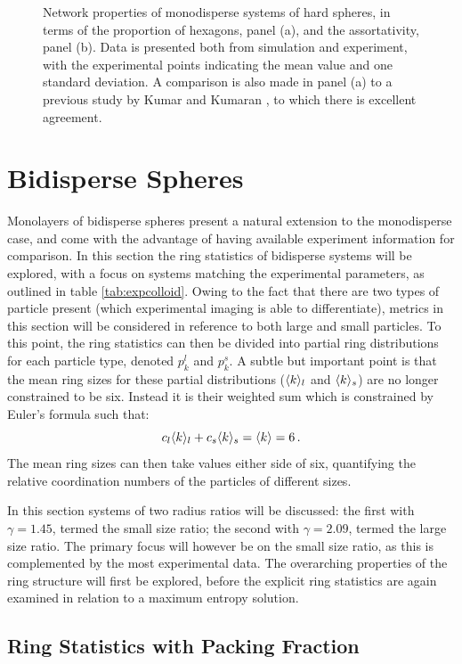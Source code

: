 \begin{figure}[bt]
     \caption{Network properties of monodisperse systems of \qtd{} hard spheres, in terms of the proportion of hexagons, panel (a), and the assortativity, panel (b). Data is presented both from simulation and experiment, with the experimental points indicating the mean value and one standard deviation. A comparison is also made in panel (a) to a previous study by Kumar and Kumaran \cite{Kumar2005}, to which there is excellent agreement.}
     \label{fig:mono}
\end{figure}


\section{Bidisperse Spheres}
\label{s:bidisperse}

Monolayers of bidisperse spheres present a natural extension to the monodisperse case, and come with the advantage of having available experiment information for comparison.
In this section the ring statistics of bidisperse systems will be explored, with a focus on systems matching the experimental parameters, as outlined in table \ref{tab:expcolloid}.
Owing to the fact that there are two types of particle present (which experimental imaging is able to differentiate), metrics in this section will be considered in reference to both large and small particles.
To this point, the ring statistics can then be divided into partial ring distributions for each particle type, denoted $p_k^l$ and $p_k^s$.
A subtle but important point is that the mean ring sizes for these partial distributions ($\langle k \rangle_l$ and $\langle k \rangle_s$) are no longer constrained to be six.
Instead it is their weighted sum which is constrained by Euler's formula such that:
\begin{equation}
	c_l\langle k \rangle_l+c_s\langle k \rangle_s = \langle k \rangle = 6\,.
\end{equation}
The mean ring sizes can then take values either side of six, quantifying the relative coordination numbers of the particles of different sizes.

In this section systems of two radius ratios will be discussed: the first with $\gamma=1.45$, termed the small size ratio; the second with $\gamma=2.09$, termed the large size ratio.
The primary focus will however be on the small size ratio, as this is complemented by the most experimental data.
The overarching properties of the ring structure will first be explored, before the explicit ring statistics are again examined in relation to a maximum entropy solution.


\subsection{Ring Statistics with Packing Fraction}

